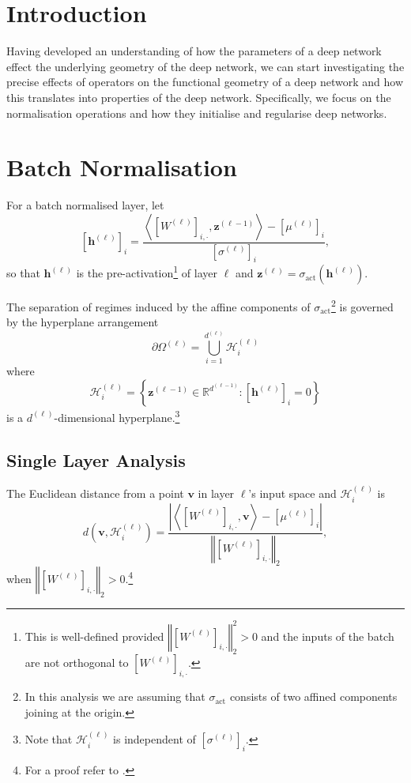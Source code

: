 \section{Introduction}

Having developed an understanding of how the parameters of a deep network effect the underlying geometry of the deep network, we can start investigating the precise effects of operators on the functional geometry of a deep network and how this translates into properties of the deep network. Specifically, we focus on the normalisation operations and how they initialise and regularise deep networks.

\section{Batch Normalisation}\label{sec:batch_norm}

For a batch normalised layer, let $$\left[\mathbf{h}^{(\ell)}\right]_i=\frac{\left\langle\left[W^{(\ell)}\right]_{i,\cdot},\mathbf{z}^{(\ell-1)}\right\rangle-\left[\mu^{(\ell)}\right]_i}{\left[\sigma^{(\ell)}\right]_i},$$so that $\mathbf{h}^{(\ell)}$ is the pre-activation\footnote{This is well-defined provided $\left\Vert\left[W^{(\ell)}\right]_{i,\cdot}\right\Vert_2^2>0$ and the inputs of the batch are not orthogonal to $\left[W^{(\ell)}\right]_{i,\cdot}$.} of layer $\ell$ and $\mathbf{z}^{(\ell)}=\sigma_{\text{act}}\left(\mathbf{h}^{(\ell)}\right)$.

The separation of regimes induced by the affine components of $\sigma_{\text{act}}$\footnote{In this analysis we are assuming that $\sigma_{\text{act}}$ consists of two affined components joining at the origin.} is governed by the hyperplane arrangement $$\partial\Omega^{(\ell)}=\bigcup_{i=1}^{d^{(\ell)}}\mathcal{H}^{(\ell)}_i$$where $$\mathcal{H}^{(\ell)}_i=\left\{\mathbf{z}^{(\ell-1)}\in\mathbb{R}^{d^{(\ell-1)}}:\left[\mathbf{h}^{(\ell)}\right]_i=0\right\}$$is a $d^{(\ell)}$-dimensional hyperplane.\footnote{Note that $\mathcal{H}^{(\ell)}_i$ is independent of $\left[\sigma^{(\ell)}\right]_i$.}

\subsection{Single Layer Analysis}\label{subsec:single_layer_analysis}

\begin{lemma}\label{lem:distance_to_hyperplane}
    The Euclidean distance from a point $\mathbf{v}$ in layer $\ell$'s input space and $\mathcal{H}^{(\ell)}_i$ is $$d\left(\mathbf{v},\mathcal{H}^{(\ell)}_i\right)=\frac{\left\vert\left\langle\left[W^{(\ell)}\right]_{i,\cdot},\mathbf{v}\right\rangle-\left[\mu^{(\ell)}\right]_i\right\vert}{\left\Vert\left[W^{(\ell)}\right]_{i,\cdot}\right\Vert_2},$$when $\left\Vert\left[W^{(\ell)}\right]_{i,\cdot}\right\Vert_2>0$.\footnote{For a proof refer to \citet{alexanderschrijverTheoryLinearInteger1998}.}
\end{lemma}

